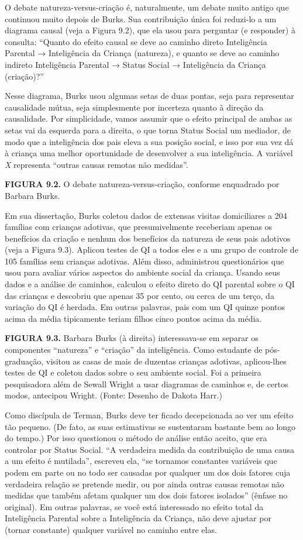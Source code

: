 \documentclass[11pt,a5paper,twoside]{book}
\begin{document}
O debate natureza-versus-criação é, naturalmente, um debate muito antigo que continuou muito depois de Burks. Sua contribuição única foi reduzi-lo a um diagrama causal (veja a Figura 9.2), que ela usou para perguntar (e responder) à consulta: “Quanto do efeito causal se deve ao caminho direto Inteligência Parental → Inteligência da Criança (natureza), e quanto se deve ao caminho indireto Inteligência Parental → Status Social → Inteligência da Criança (criação)?”

Nesse diagrama, Burks usou algumas setas de duas pontas, seja para representar causalidade mútua, seja simplesmente por incerteza quanto à direção da causalidade. Por simplicidade, vamos assumir que o efeito principal de ambas as setas vai da esquerda para a direita, o que torna Status Social um mediador, de modo que a inteligência dos pais eleva a sua posição social, e isso por sua vez dá à criança uma melhor oportunidade de desenvolver a sua inteligência. A variável \textit{X} representa “outras causas remotas não medidas”.

\textbf{FIGURA 9.2.} O debate natureza-versus-criação, conforme enquadrado por Barbara Burks.

Em sua dissertação, Burks coletou dados de extensas visitas domiciliares a 204 famílias com crianças adotivas, que presumivelmente receberiam apenas os benefícios da criação e nenhum dos benefícios da natureza de seus pais adotivos (veja a Figura 9.3). Aplicou testes de QI a todos eles e a um grupo de controle de 105 famílias sem crianças adotivas. Além disso, administrou questionários que usou para avaliar vários aspectos do ambiente social da criança. Usando seus dados e a análise de caminhos, calculou o efeito direto do QI parental sobre o QI das crianças e descobriu que apenas 35 por cento, ou cerca de um terço, da variação do QI é herdada. Em outras palavras, pais com um QI quinze pontos acima da média tipicamente teriam filhos cinco pontos acima da média.

\textbf{FIGURA 9.3.} Barbara Burks (à direita) interessava-se em separar os componentes “natureza” e “criação” da inteligência. Como estudante de pós-graduação, visitou as casas de mais de duzentas crianças adotivas, aplicou-lhes testes de QI e coletou dados sobre o seu ambiente social. Foi a primeira pesquisadora além de Sewall Wright a usar diagramas de caminhos e, de certos modos, antecipou Wright. (Fonte: Desenho de Dakota Harr.)

Como discípula de Terman, Burks deve ter ficado decepcionada ao ver um efeito tão pequeno. (De fato, as suas estimativas se sustentaram bastante bem ao longo do tempo.) Por isso questionou o método de análise então aceito, que era controlar por Status Social. “A verdadeira medida da contribuição de uma causa a um efeito é mutilada”, escreveu ela, “se tornamos constantes variáveis que podem em parte ou no todo ser causadas por qualquer um dos dois fatores cuja verdadeira relação se pretende medir, ou por ainda outras causas remotas não medidas que também afetam qualquer um dos dois fatores isolados” (ênfase no original). Em outras palavras, se você está interessado no efeito total da Inteligência Parental sobre a Inteligência da Criança, não deve ajustar por (tornar constante) qualquer variável no caminho entre elas.
\end{document}
